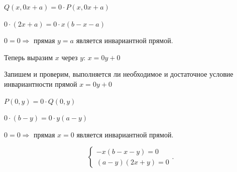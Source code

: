 \begin{center}
$Q(x, 0x+a) = 0 \cdot P(x, 0x+a)$

$0 \cdot (2x +a) = 0 \cdot  x(b - x - a)$
\end{center}
$0 = 0 \Rightarrow$ прямая $y = a$ является инвариантной прямой.

Теперь выразим $x$ через $y$: $x = 0y + 0$

Запишем и проверим, выполняется ли необходимое и достаточное условие инвариантности прямой $x = 0y + 0$
\begin{center}
$P(0, y) = 0 \cdot  Q(0, y)$

$0 \cdot (b - y) = 0 \cdot   y(a -y)$
\end{center}
$0 = 0 \Rightarrow$ прямая $x = 0$ является инвариантной прямой.


$$ 
\left \lbrace 
\begin{matrix}
-x(b-x-y) =  0 \\
(a-y)(2x+y)  =  0
\end{matrix} 
\right . .$$
\newpage
